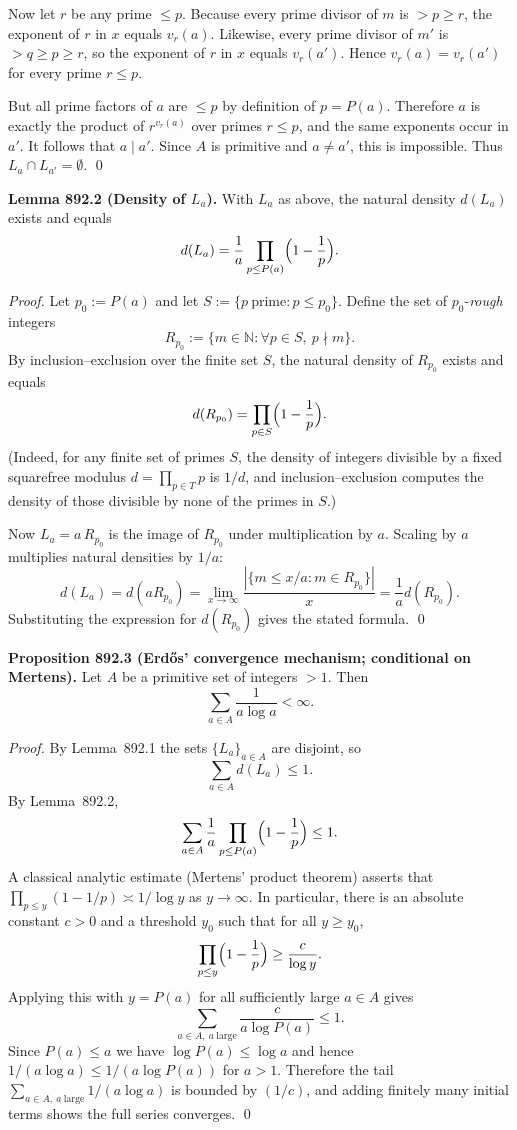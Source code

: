 Now let $r$ be any prime $\le p$.
Because every prime divisor of $m$ is $>p\ge r$, the exponent of $r$ in $x$ equals
$v_r(a)$. Likewise, every prime divisor of $m'$ is $>q\ge p\ge r$, so the exponent
of $r$ in $x$ equals $v_r(a')$. Hence $v_r(a)=v_r(a')$ for every prime $r\le p$.

But all prime factors of $a$ are $\le p$ by definition of $p=P(a)$.
Therefore $a$ is exactly the product of $r^{v_r(a)}$ over primes $r\le p$, and the
same exponents occur in $a'$. It follows that $a\mid a'$.
Since $A$ is primitive and $a\ne a'$, this is impossible.
Thus $L_a\cap L_{a'}=\emptyset$.
\qed

\medskip
\noindent\textbf{Lemma 892.2 (Density of $L_a$).}
With $L_a$ as above, the natural density $d(L_a)$ exists and equals
\[
 d(L_a)=\frac{1}{a}\prod_{p\le P(a)}\Bigl(1-\frac{1}{p}\Bigr).
\]

\emph{Proof.}
Let $p_0:=P(a)$ and let $S:=\{p\ \text{prime}: p\le p_0\}$.
Define the set of $p_0$-\emph{rough} integers
\[
R_{p_0}:=\{m\in\mathbb{N}: \forall p\in S,\ p\nmid m\}.
\]
By inclusion--exclusion over the finite set $S$, the natural density of $R_{p_0}$
exists and equals
\[
 d(R_{p_0})=\prod_{p\in S}\Bigl(1-\frac{1}{p}\Bigr).
\]
(Indeed, for any finite set of primes $S$, the density of integers divisible by a
fixed squarefree modulus $d=\prod_{p\in T}p$ is $1/d$, and inclusion--exclusion
computes the density of those divisible by none of the primes in $S$.)

Now $L_a = a\,R_{p_0}$ is the image of $R_{p_0}$ under multiplication by $a$.
Scaling by $a$ multiplies natural densities by $1/a$:
\[
 d(L_a)=d(aR_{p_0})=\lim_{x\to\infty}\frac{|\{m\le x/a: m\in R_{p_0}\}|}{x}
      =\frac{1}{a} d(R_{p_0}).
\]
Substituting the expression for $d(R_{p_0})$ gives the stated formula.
\qed

\medskip
\noindent\textbf{Proposition 892.3 (Erd\H{o}s’ convergence mechanism; conditional on Mertens).}
Let $A$ be a primitive set of integers $>1$. Then
\[
\sum_{a\in A} \frac{1}{a\log a}<\infty.
\]

\emph{Proof.}
By Lemma~892.1 the sets $\{L_a\}_{a\in A}$ are disjoint, so
\[ \sum_{a\in A} d(L_a) \le 1. \]
By Lemma~892.2,
\[ \sum_{a\in A} \frac{1}{a}\prod_{p\le P(a)}\Bigl(1-\frac{1}{p}\Bigr) \le 1.
\]
A classical analytic estimate (Mertens’ product theorem) asserts that
\(\prod_{p\le y}(1-1/p) \asymp 1/\log y\) as $y\to\infty$.
In particular, there is an absolute constant $c>0$ and a threshold $y_0$ such that
for all $y\ge y_0$,
\[
\prod_{p\le y}\Bigl(1-\frac{1}{p}\Bigr) \ge \frac{c}{\log y}.
\]
Applying this with $y=P(a)$ for all sufficiently large $a\in A$ gives
\[
\sum_{a\in A,\ a\ \text{large}} \frac{c}{a\log P(a)} \le 1.
\]
Since $P(a)\le a$ we have $\log P(a)\le \log a$ and hence
$1/(a\log a)\le 1/(a\log P(a))$ for $a>1$. Therefore the tail
$\sum_{a\in A,\ a\ \text{large}} 1/(a\log a)$ is bounded by $(1/c)$, and adding
finitely many initial terms shows the full series converges.
\qed

